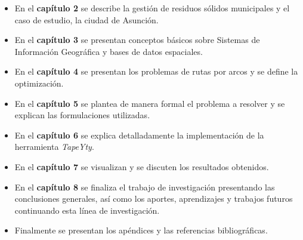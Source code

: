 \begin{itemize}
    \item En el \textbf{capítulo 2} se describe la gestión de residuos sólidos municipales y el caso de estudio, la ciudad de Asunción.
    \item En el \textbf{capítulo 3} se presentan conceptos básicos sobre Sistemas de Información Geográfica y bases de datos espaciales.
    \item En el \textbf{capítulo 4} se presentan los problemas de rutas por arcos y se define la optimización.
    \item En el \textbf{capítulo 5} se plantea de manera formal el problema a resolver y se explican las formulaciones utilizadas.
    \item En el \textbf{capítulo 6} se explica detalladamente la implementación de la herramienta \textit{TapeYty}. 
    \item En el \textbf{capítulo 7} se visualizan y se discuten los resultados obtenidos.
    \item En el \textbf{capítulo 8} se finaliza el trabajo de investigación presentando las conclusiones generales, así como los aportes, aprendizajes y trabajos futuros continuando esta línea de investigación.
    \item Finalmente se presentan los apéndices y las referencias bibliográficas.
\end{itemize}